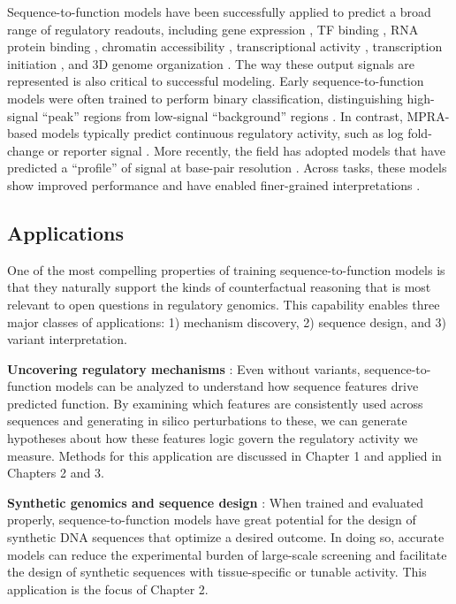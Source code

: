 \begin{dissertationintroduction}
Sequence-to-function models have been successfully applied to predict a broad range of regulatory readouts, including gene expression \cite{Linder2025-or}, TF binding \cite{Avsec2021-sw}, RNA protein binding \cite{Horlacher2022-ja}, chromatin accessibility \cite{Pampari2025-lm}, transcriptional activity \cite{De_Almeida2022-aa,Gosai2023-cw}, transcription initiation \cite{Cochran2024-ab}, and 3D genome organization \cite{Fudenberg2020-gs}. The way these output signals are represented is also critical to successful modeling. Early sequence-to-function models were often trained to perform binary classification, distinguishing high-signal “peak” regions from low-signal “background” regions \cite{Zhou2015-rk}. In contrast, MPRA-based models typically predict continuous regulatory activity, such as log fold-change or reporter signal \cite{De_Almeida2022-aa}. More recently, the field has adopted models that have predicted a “profile” of signal at base-pair resolution \cite{Schreiber2021-vf}. Across tasks, these models show improved performance and have enabled finer-grained interpretations \cite{Avsec2021-sw,Pampari2025-lm}.

\subsection{Applications}

One of the most compelling properties of training sequence-to-function models is that they naturally support the kinds of counterfactual reasoning that is most relevant to open questions in regulatory genomics. This capability enables three major classes of applications: 1) mechanism discovery, 2) sequence design, and 3) variant interpretation.

\textbf{Uncovering regulatory mechanisms} \cite{Toneyan2024-nt}: Even without variants, sequence-to-function models can be analyzed to understand how sequence features drive predicted function. By examining which features are consistently used across sequences and generating in silico perturbations to these, we can generate hypotheses about how these features logic govern the regulatory activity we measure. Methods for this application are discussed in Chapter 1 and applied in Chapters 2 and 3.

\textbf{Synthetic genomics and sequence design} \cite{De-Winter2025-nz}: When trained and evaluated properly, sequence-to-function models have great potential for the design of synthetic DNA sequences that optimize a desired outcome. In doing so, accurate models can reduce the experimental burden of large-scale screening and facilitate the design of synthetic sequences with tissue-specific or tunable activity. This application is the focus of Chapter 2.


\end{dissertationintroduction}
